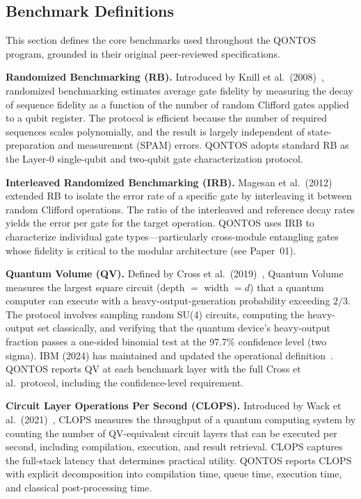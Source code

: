 \documentclass[conference]{IEEEtran}
\begin{document}
\subsection{Benchmark Definitions}

This section defines the core benchmarks used throughout the QONTOS program, grounded in their original peer-reviewed specifications.

\textbf{Randomized Benchmarking (RB).} Introduced by Knill et al.\ (2008)~\cite{knill2008}, randomized benchmarking estimates average gate fidelity by measuring the decay of sequence fidelity as a function of the number of random Clifford gates applied to a qubit register. The protocol is efficient because the number of required sequences scales polynomially, and the result is largely independent of state-preparation and measurement (SPAM) errors. QONTOS adopts standard RB as the Layer-0 single-qubit and two-qubit gate characterization protocol.

\textbf{Interleaved Randomized Benchmarking (IRB).} Magesan et al.\ (2012)~\cite{magesan2012} extended RB to isolate the error rate of a specific gate by interleaving it between random Clifford operations. The ratio of the interleaved and reference decay rates yields the error per gate for the target operation. QONTOS uses IRB to characterize individual gate types---particularly cross-module entangling gates whose fidelity is critical to the modular architecture (see Paper~01).

\textbf{Quantum Volume (QV).} Defined by Cross et al.\ (2019)~\cite{cross2019}, Quantum Volume measures the largest square circuit (depth $=$ width $= d$) that a quantum computer can execute with a heavy-output-generation probability exceeding $2/3$. The protocol involves sampling random SU(4) circuits, computing the heavy-output set classically, and verifying that the quantum device's heavy-output fraction passes a one-sided binomial test at the 97.7\% confidence level (two sigma). IBM (2024) has maintained and updated the operational definition~\cite{ibm2024}. QONTOS reports QV at each benchmark layer with the full Cross et al.\ protocol, including the confidence-level requirement.

\textbf{Circuit Layer Operations Per Second (CLOPS).} Introduced by Wack et al.\ (2021)~\cite{wack2021}, CLOPS measures the throughput of a quantum computing system by counting the number of QV-equivalent circuit layers that can be executed per second, including compilation, execution, and result retrieval. CLOPS captures the full-stack latency that determines practical utility. QONTOS reports CLOPS with explicit decomposition into compilation time, queue time, execution time, and classical post-processing time.
\end{document}
